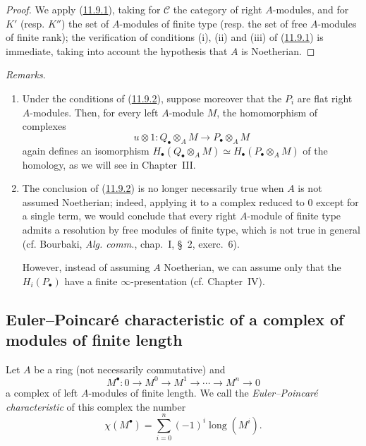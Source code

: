 \begin{proof}
We apply (\hyperref[0.11.9.1]{11.9.1}), taking for $\mathcal C$ the
category of right $A$-modules, and for $K'$ (resp. $K''$) the set of
$A$-modules of finite type (resp. the set of free $A$-modules of finite
rank); the verification of conditions (i), (ii) and (iii) of
(\hyperref[0.11.9.1]{11.9.1}) is immediate, taking into account the
hypothesis that $A$ is Noetherian.
\end{proof}

\begin{env}[11.9.3]
\label{0.11.9.3}
\emph{Remarks}.
\begin{enumerate}
\item[{\rm(i)}] Under the conditions of
(\hyperref[0.11.9.2]{11.9.2}), suppose moreover that the $P_i$ are flat
right $A$-modules. Then, for every left $A$-module $M$,
the homomorphism of complexes
\[
u\otimes 1:Q_\bullet\otimes_A M\longrightarrow P_\bullet\otimes_A M
\]
again defines an isomorphism
$H_\bullet(Q_\bullet\otimes_A M)\simeq
H_\bullet(P_\bullet\otimes_A M)$ of the homology, as we will see in
Chapter~III.
\item[{\rm(ii)}] The conclusion of (\hyperref[0.11.9.2]{11.9.2}) is no
longer necessarily true when $A$ is not assumed Noetherian; indeed,
applying it to a complex reduced to $0$ except for a single term, we would
conclude that every right $A$-module of finite type admits a resolution
by free modules of finite type, which is not true in general
(cf. Bourbaki, \emph{Alg. comm.}, chap.~I, \S~2, exerc.~6).

However, instead of assuming $A$ Noetherian, we can assume only that
the $H_i(P_\bullet)$ have a finite $\infty$-presentation (cf. Chapter~IV).
\end{enumerate}
\end{env}

\subsection{Euler--Poincaré characteristic of a complex of modules of
finite length}
\label{subsection:0.11.10}

\begin{env}[11.10.1]
\label{0.11.10.1}
Let $A$ be a ring (not necessarily commutative) and
\[
\label{0.11.10.1.1}
\tag{11.10.1.1}
M^\bullet:0\longrightarrow M^0\longrightarrow M^1
\longrightarrow\cdots\longrightarrow M^n\longrightarrow0
\]
a complex of left $A$-modules of finite length. We call the
\emph{Euler--Poincaré characteristic} of this complex the number
\[
\label{0.11.10.1.2}
\tag{11.10.1.2}
\chi(M^\bullet)=\sum_{i=0}^{n}(-1)^i\operatorname{long}(M^i).
\]
\end{env}

